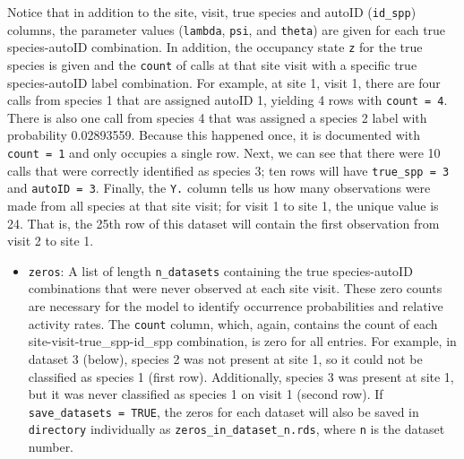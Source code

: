 \documentclass[
]{article}
\newenvironment{Shaded}{\begin{snugshade}}{\end{snugshade}}
\newcommand{\CommentTok}[1]{\textcolor[rgb]{0.56,0.35,0.01}{\textit{#1}}}
\newcommand{\DecValTok}[1]{\textcolor[rgb]{0.00,0.00,0.81}{#1}}
\newcommand{\FunctionTok}[1]{\textcolor[rgb]{0.13,0.29,0.53}{\textbf{#1}}}
\newcommand{\NormalTok}[1]{#1}
\newcommand{\OtherTok}[1]{\textcolor[rgb]{0.56,0.35,0.01}{#1}}
\newcommand{\SpecialCharTok}[1]{\textcolor[rgb]{0.81,0.36,0.00}{\textbf{#1}}}
\providecommand{\tightlist}{%
  \setlength{\itemsep}{0pt}\setlength{\parskip}{0pt}}
\begin{document}
\linespread{1}

Notice that in addition to the site, visit, true species and autoID (\texttt{id\_spp}) columns, the parameter values (\texttt{lambda}, \texttt{psi}, and \texttt{theta}) are given for each true species-autoID combination. In addition, the occupancy state \texttt{z} for the true species is given and the \texttt{count} of calls at that site visit with a specific true species-autoID label combination. For example, at site 1, visit 1, there are four calls from species 1 that are assigned autoID 1, yielding 4 rows with \texttt{count\ =\ 4}. There is also one call from species 4 that was assigned a species 2 label with probability 0.02893559. Because this happened once, it is documented with \texttt{count\ =\ 1} and only occupies a single row. Next, we can see that there were 10 calls that were correctly identified as species 3; ten rows will have \texttt{true\_spp\ =\ 3} and \texttt{autoID\ =\ 3}. Finally, the \texttt{Y.} column tells us how many observations were made from all species at that site visit; for visit 1 to site 1, the unique value is 24. That is, the 25th row of this dataset will contain the first observation from visit 2 to site 1.

\begin{itemize}
\tightlist
\item
  \texttt{zeros}: A list of length \texttt{n\_datasets} containing the true species-autoID combinations that were never observed at each site visit. These zero counts are necessary for the model to identify occurrence probabilities and relative activity rates. The \texttt{count} column, which, again, contains the count of each site-visit-true\_spp-id\_spp combination, is zero for all entries. For example, in dataset 3 (below), species 2 was not present at site 1, so it could not be classified as species 1 (first row). Additionally, species 3 was present at site 1, but it was never classified as species 1 on visit 1 (second row). If \texttt{save\_datasets\ =\ TRUE}, the zeros for each dataset will also be saved in \texttt{directory} individually as \texttt{zeros\_in\_dataset\_n.rds}, where \texttt{n} is the dataset number.
\end{itemize}

\linespread{1}

\begin{Shaded}
\end{Shaded}
\end{document}
